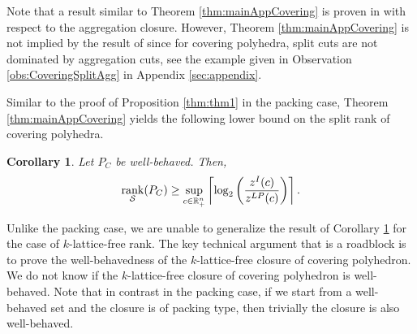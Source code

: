 \documentclass[11pt]{article}
\newcommand{\R}{\mathbb{R}}
\DeclareMathOperator{\rank}{rank}
\renewcommand{\S}{\mathcal{S}}
\renewcommand{\L}{\mathcal{L}}
\newtheorem{proposition}{Proposition}
\newtheorem{corollary}{Corollary}
\newcommand{\cred}{\color{black}}
\newcommand{\zLPc}{z^{LP}(c)}
\newcommand{\zIc}{z^{I}(c)}
\begin{document}
Note that a {\cred result similar} to Theorem \ref{thm:mainAppCovering} is proven in \cite{bodur2016aggregation} with respect to the {\cred aggregation closure}. However, Theorem \ref{thm:mainAppCovering} is not implied by the result of \cite{bodur2016aggregation} since for covering polyhedra, split cuts are not dominated by {\cred aggregation cuts}, see the example given in Observation \ref{obs:CoveringSplitAgg} in Appendix \ref{sec:appendix}.

Similar to the proof of Proposition \ref{thm:thm1} in the packing case, Theorem \ref{thm:mainAppCovering} yields the following lower bound on the split rank of covering polyhedra.

\begin{corollary}
\label{cor:SplitRankPolyCovering}
Let $P_C$ be well-behaved. Then, 
$$\rank_{\S}(P_C) \geq {\cred \sup_{c \in \R_+^n}} \left\lceil \textup{log}_2\left( \frac{\zIc}{\zLPc}\right)\right\rceil.$$
\end{corollary}

Unlike the packing case, we are unable to generalize the result of Corollary \ref{cor:SplitRankPolyCovering} for the case of $k$-lattice-free rank. The key technical argument that is a roadblock is to prove the well-behavedness of the $k$-lattice-free closure of covering polyhedron.  {\cred We do not know if the $k$-lattice-free closure of covering polyhedron is well-behaved. Note that in contrast} in the packing case, if we start from a well-behaved set and the closure is of packing type, then trivially the closure is also well-behaved. 





\end{document}
